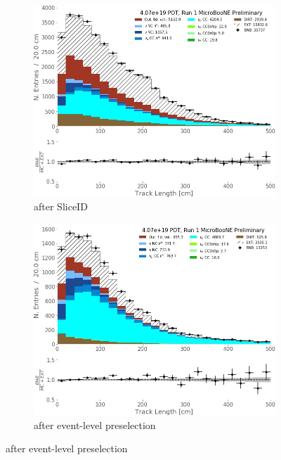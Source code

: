 \begin{figure}[H] 
\begin{center}
    \begin{subfigure}[b]{0.3\textwidth}
    \centering
    \includegraphics[width=1.00\textwidth]{NuMuCCsel/Images/Ryan/Run1_trklen_SliceID.jpg}
    \caption{\label{fig:NuMUCCsel:ryan:trklenSliceID} after SliceID}
    \end{subfigure}
    \begin{subfigure}[b]{0.3\textwidth}
    \centering
    \includegraphics[width=1.00\textwidth]{NuMuCCsel/Images/Ryan/Run1_trklen_EvtSel.jpg}
    \caption{\label{fig:NuMUCCsel:ryan:trklenEvt} after event-level preselection}

\end{subfigure}
\end{center}
\end{figure}

